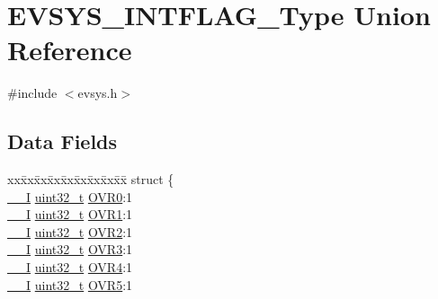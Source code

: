 \hypertarget{union_e_v_s_y_s___i_n_t_f_l_a_g___type}{}\section{E\+V\+S\+Y\+S\+\_\+\+I\+N\+T\+F\+L\+A\+G\+\_\+\+Type Union Reference}
\label{union_e_v_s_y_s___i_n_t_f_l_a_g___type}


{\ttfamily \#include $<$evsys.\+h$>$}

\subsection*{Data Fields}
\begin{DoxyCompactItemize}
\item 
\begin{tabbing}
xx\=xx\=xx\=xx\=xx\=xx\=xx\=xx\=xx\=\kill
struct \{\\
\>\mbox{\hyperlink{core__cm0plus_8h_af63697ed9952cc71e1225efe205f6cd3}{\_\_I}} \mbox{\hyperlink{union_e_v_s_y_s___i_n_t_f_l_a_g___type_a7c2ec0f7b3f1314bdede58b182af397c}{uint32\_t}} \mbox{\hyperlink{union_e_v_s_y_s___i_n_t_f_l_a_g___type_ad293db33abcf72a8726cb982538d1357}{OVR0}}:1\\
\>\mbox{\hyperlink{core__cm0plus_8h_af63697ed9952cc71e1225efe205f6cd3}{\_\_I}} \mbox{\hyperlink{union_e_v_s_y_s___i_n_t_f_l_a_g___type_a7c2ec0f7b3f1314bdede58b182af397c}{uint32\_t}} \mbox{\hyperlink{union_e_v_s_y_s___i_n_t_f_l_a_g___type_a1ec0f3f8556b5739e94b4cba65beb9be}{OVR1}}:1\\
\>\mbox{\hyperlink{core__cm0plus_8h_af63697ed9952cc71e1225efe205f6cd3}{\_\_I}} \mbox{\hyperlink{union_e_v_s_y_s___i_n_t_f_l_a_g___type_a7c2ec0f7b3f1314bdede58b182af397c}{uint32\_t}} \mbox{\hyperlink{union_e_v_s_y_s___i_n_t_f_l_a_g___type_a7ecbb2365c8581950ebf434edbc17052}{OVR2}}:1\\
\>\mbox{\hyperlink{core__cm0plus_8h_af63697ed9952cc71e1225efe205f6cd3}{\_\_I}} \mbox{\hyperlink{union_e_v_s_y_s___i_n_t_f_l_a_g___type_a7c2ec0f7b3f1314bdede58b182af397c}{uint32\_t}} \mbox{\hyperlink{union_e_v_s_y_s___i_n_t_f_l_a_g___type_aa996937d87f1504e02ecd1470e45a269}{OVR3}}:1\\
\>\mbox{\hyperlink{core__cm0plus_8h_af63697ed9952cc71e1225efe205f6cd3}{\_\_I}} \mbox{\hyperlink{union_e_v_s_y_s___i_n_t_f_l_a_g___type_a7c2ec0f7b3f1314bdede58b182af397c}{uint32\_t}} \mbox{\hyperlink{union_e_v_s_y_s___i_n_t_f_l_a_g___type_ad6faa06789f9593988d299c69b1923de}{OVR4}}:1\\
\>\mbox{\hyperlink{core__cm0plus_8h_af63697ed9952cc71e1225efe205f6cd3}{\_\_I}} \mbox{\hyperlink{union_e_v_s_y_s___i_n_t_f_l_a_g___type_a7c2ec0f7b3f1314bdede58b182af397c}{uint32\_t}} \mbox{\hyperlink{union_e_v_s_y_s___i_n_t_f_l_a_g___type_a4e68303c6bb244c10c83643d2dace5e5}{OVR5}}:1\\

\end{tabbing}
\end{DoxyCompactItemize}
